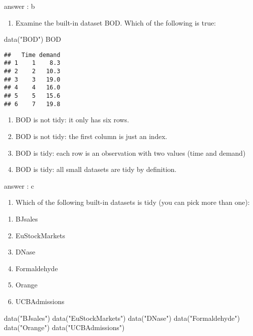 \documentclass[
]{article}
\newenvironment{Shaded}{\begin{snugshade}}{\end{snugshade}}
\newcommand{\FunctionTok}[1]{\textcolor[rgb]{0.00,0.00,0.00}{#1}}
\newcommand{\NormalTok}[1]{#1}
\newcommand{\StringTok}[1]{\textcolor[rgb]{0.31,0.60,0.02}{#1}}
\providecommand{\tightlist}{%
  \setlength{\itemsep}{0pt}\setlength{\parskip}{0pt}}
\begin{document}
answer : b

\begin{enumerate}
\def\labelenumi{\arabic{enumi}.}
\setcounter{enumi}{2}
\tightlist
\item
  Examine the built-in dataset BOD. Which of the following is true:
\end{enumerate}

\begin{Shaded}
\begin{Highlighting}[]
\FunctionTok{data}\NormalTok{(}\StringTok{"BOD"}\NormalTok{)}
\NormalTok{BOD}
\end{Highlighting}
\end{Shaded}

\begin{verbatim}
##   Time demand
## 1    1    8.3
## 2    2   10.3
## 3    3   19.0
## 4    4   16.0
## 5    5   15.6
## 6    7   19.8
\end{verbatim}

\begin{enumerate}
\def\labelenumi{\alph{enumi}.}
\tightlist
\item
  BOD is not tidy: it only has six rows.
\item
  BOD is not tidy: the first column is just an index.
\item
  BOD is tidy: each row is an observation with two values (time and
  demand)
\item
  BOD is tidy: all small datasets are tidy by definition.
\end{enumerate}

answer : c

\begin{enumerate}
\def\labelenumi{\arabic{enumi}.}
\setcounter{enumi}{3}
\tightlist
\item
  Which of the following built-in datasets is tidy (you can pick more
  than one):
\end{enumerate}

\begin{enumerate}
\def\labelenumi{\alph{enumi}.}
\tightlist
\item
  BJsales
\item
  EuStockMarkets
\item
  DNase
\item
  Formaldehyde
\item
  Orange
\item
  UCBAdmissions
\end{enumerate}

\begin{Shaded}
\begin{Highlighting}[]
\FunctionTok{data}\NormalTok{(}\StringTok{"BJsales"}\NormalTok{)}
\FunctionTok{data}\NormalTok{(}\StringTok{"EuStockMarkets"}\NormalTok{)}
\FunctionTok{data}\NormalTok{(}\StringTok{"DNase"}\NormalTok{)}
\FunctionTok{data}\NormalTok{(}\StringTok{"Formaldehyde"}\NormalTok{)}
\FunctionTok{data}\NormalTok{(}\StringTok{"Orange"}\NormalTok{)}
\FunctionTok{data}\NormalTok{(}\StringTok{"UCBAdmissions"}\NormalTok{)}
\end{Highlighting}
\end{Shaded}
\end{document}
